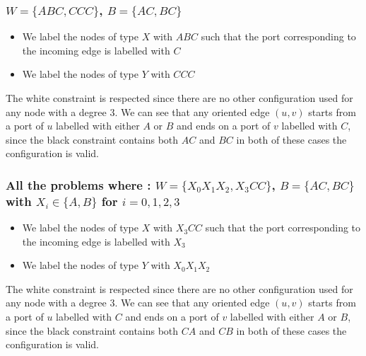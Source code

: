 \subsubsection[(W = (ABC, CCC), B = (AC,BC)]{$W = \{ABC, CCC\}$, $B = \{AC, BC\}$}
\begin{itemize}
    \item We label the nodes of type $X$ with $ABC$ such that the port corresponding to the incoming edge is labelled with $C$
    \item We label the nodes of type $Y$ with $CCC$
\end{itemize}
The white constraint is respected since there are no other configuration used for any node with a degree 3.
We can see that any oriented edge $(u,v)$ starts from a port of $u$ labelled with either $A$ or $B$ and ends on a port of $v$ labelled with $C$, since the black constraint contains both $AC$ and $BC$ in both of these cases the configuration is valid.

\subsubsection[(W = (X0X1X2, X3CC), B = (AC,BC)]{All the problems where : $W = \{X_0X_1X_2, X_3CC\}$, $B = \{AC, BC\}$ with $X_i \in \{A,B\}$ for $i=0,1,2,3$}
\begin{itemize}
    \item We label the nodes of type $X$ with $X_3CC$ such that the port corresponding to the incoming edge is labelled with $X_3$
    \item We label the nodes of type $Y$ with $X_0X_1X_2$
\end{itemize}
The white constraint is respected since there are no other configuration used for any node with a degree 3.
We can see that any oriented edge $(u,v)$ starts from a port of $u$ labelled with $C$ and ends on a port of $v$ labelled with either $A$ or $B$, since the black constraint contains both $CA$ and $CB$ in both of these cases the configuration is valid.

